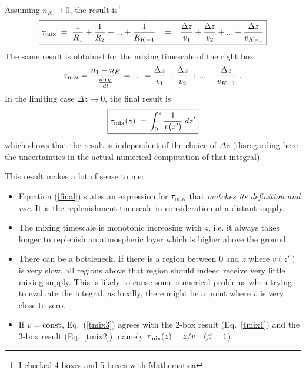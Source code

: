 \documentclass[11pt]{article}
\begin{document}
Assuming $n_K \to 0$, the result is\footnote{I checked 4 boxes and 5
  boxes with Mathematica}
\begin{equation}
  \boxed{\tau_{\rm mix} \;=\; 
  \frac{1}{R_1} + \frac{1}{R_2} + ... + \frac{1}{R_{K-1}}
  \;\;\;=\;\;\; 
  \frac{\Delta z}{v_1} + \frac{\Delta z}{v_2} + ... + \frac{\Delta z}{v_{K-1}}}
  \label{tmix3}
\end{equation}
The same result is obtained for the mixing timescale of the right box
\begin{equation}
  {\tau_{\rm mix}} = \frac{n_1-n_K}{\frac{dn_K}{dt}}
   = \ldots 
   = \frac{\Delta z}{v_1} + \frac{\Delta z}{v_2} + 
     ... + \frac{\Delta z}{v_{K-1}} \ .
\end{equation}
In the limiting case $\Delta z\to 0$, the final result is
\begin{equation}
  \boxed{
  \tau_{\rm mix}(z) \;=\, \int_0^z \frac{1}{v(z')}\;dz'}
  \label{final}
\end{equation}
which shows that the result is independent of the choice 
of $\Delta z$ (disregarding here the uncertainties in
the actual numerical computation of that integral).


\newpage
This result makes a lot of sense to me:
\begin{itemize}
\item Equation (\ref{final}) states an expression for $\tau_{\rm mix}$
  that {\it matches its definition and use}. It is the replenishment timescale
  in consideration of a distant supply. 
\item The mixing timescale is monotonic increasing with $z$, i.e. it
  always takes longer to replenish an atmospheric layer which is
  higher above the ground.
\item There can be a bottleneck. If there is a region between 0 and
  $z$ where $v(z')$ is very slow, all regions above that region
  should indeed receive very little mixing supply.  This is likely to cause some
  numerical problems when trying to evaluate the integral, as locally,
  there might be a point where $v$ is very close to zero.
\item If $v=\rm const$, Eq.~(\ref{tmix3}) agrees with the 2-box result
  (Eq.~\ref{tmix1}) and the 3-box result (Eq.~\ref{tmix2}), namely
  $\tau_{\rm mix}(z)=z/v\quad(\beta=1$).
\end{itemize}



\end{document}
